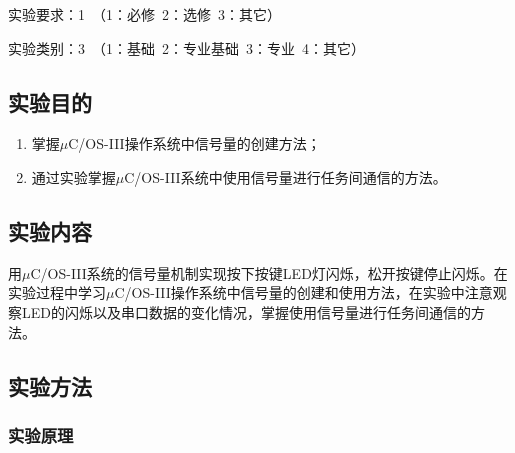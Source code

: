 ﻿\documentclass[UTF8,12pt]{article}
\begin{document}
实验要求：1\ （1：必修\ 2：选修\ 3：其它）

实验类别：3\ （1：基础\ 2：专业基础\ 3：专业\ 4：其它）

\subsection{实验目的}
\begin{enumerate}
  \item 掌握$\mu$C/OS-III操作系统中信号量的创建方法；
  \item 通过实验掌握$\mu$C/OS-III系统中使用信号量进行任务间通信的方法。
\end{enumerate}

\subsection{实验内容}
用$\mu$C/OS-III系统的信号量机制实现按下按键LED灯闪烁，松开按键停止闪烁。在实验过程中学习$\mu$C/OS-III操作系统中信号量的创建和使用方法，在实验中注意观察LED的闪烁以及串口数据的变化情况，掌握使用信号量进行任务间通信的方法。

\subsection{实验方法}

\subsubsection{实验原理}
\end{document}
